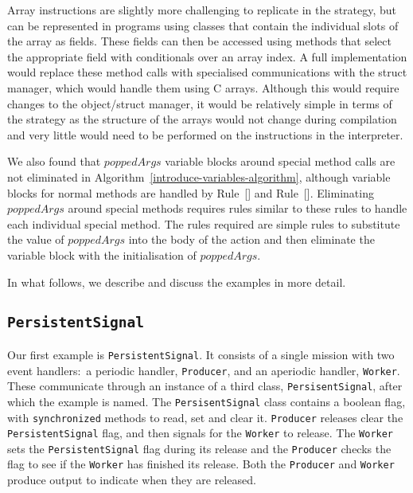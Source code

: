 Array instructions are slightly more challenging to replicate in the
strategy, but can be represented in programs using classes that
contain the individual slots of the array as fields. 
These fields can then be accessed using methods that select the
appropriate field with conditionals over an array index.
A full implementation would replace these method calls with
specialised communications with the struct manager, which would handle
them using C arrays.
Although this would require changes to the object/struct manager, it
would be relatively simple in terms of the strategy as the structure
of the arrays would not change during compilation and very little
would need to be performed on the instructions in the interpreter.

We also found that $poppedArgs$ variable blocks around special method
calls are not eliminated in
Algorithm~\ref{introduce-variables-algorithm}, although variable
blocks for normal methods are handled by
Rule~[] and
Rule~[].
Eliminating $poppedArgs$ around special methods requires rules similar
to these rules to handle each individual special method.
The rules required are simple rules to substitute the value of
$poppedArgs$ into the body of the action and then eliminate the
variable block with the initialisation of $poppedArgs$.

In what follows, we describe and discuss the examples in more detail.

\subsection{\texorpdfstring{\texttt{PersistentSignal}}{PersistentSignal}}
\label{persistent-signal-subsection}

Our first example is \texttt{PersistentSignal}. 
It consists of a single mission with two event handlers:~a periodic
handler, \texttt{Producer}, and an aperiodic handler, \texttt{Worker}.
These communicate through an instance of a third class,
\texttt{PersisentSignal}, after which the example is named.
The \texttt{PersisentSignal} class contains a boolean flag, with
\texttt{synchronized} methods to read, set and clear it.
\texttt{Producer} releases clear the \texttt{PersistentSignal} flag, and then signals
for the \texttt{Worker} to release.
The \texttt{Worker} sets the \texttt{PersistentSignal} flag during its
release and the \texttt{Producer} checks the flag to see if the
\texttt{Worker} has finished its release.
Both the \texttt{Producer} and \texttt{Worker} produce output to
indicate when they are released.

